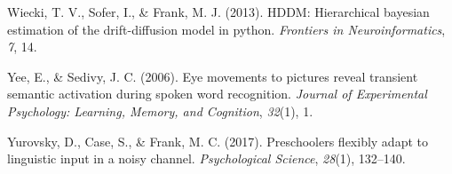 \documentclass[english,floatsintext,man]{apa6}
\theoremstyle{definition}
\theoremstyle{definition}
\theoremstyle{definition}
\theoremstyle{remark}
\begin{document}
\leavevmode\hypertarget{ref-wiecki2013hddm}{}%
Wiecki, T. V., Sofer, I., \& Frank, M. J. (2013). HDDM: Hierarchical
bayesian estimation of the drift-diffusion model in python.
\emph{Frontiers in Neuroinformatics}, \emph{7}, 14.

\leavevmode\hypertarget{ref-yee2006eye}{}%
Yee, E., \& Sedivy, J. C. (2006). Eye movements to pictures reveal
transient semantic activation during spoken word recognition.
\emph{Journal of Experimental Psychology: Learning, Memory, and
Cognition}, \emph{32}(1), 1.

\leavevmode\hypertarget{ref-yurovsky2017preschoolers}{}%
Yurovsky, D., Case, S., \& Frank, M. C. (2017). Preschoolers flexibly
adapt to linguistic input in a noisy channel. \emph{Psychological
Science}, \emph{28}(1), 132--140.
\end{document}
